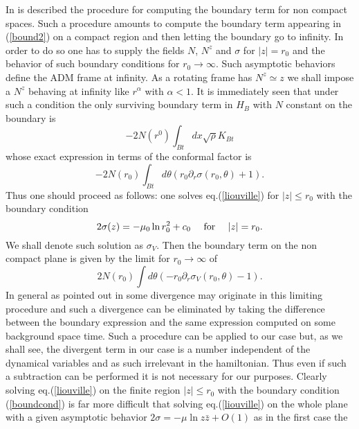 \documentclass[a4paper,12pt]{article}
\begin{document}
In \cite{hawkinghunter} is described the procedure  for computing the
boundary term for non compact spaces. Such a procedure amounts to
compute 
the boundary term appearing in (\ref{bound2}) on a compact region and then
letting the boundary go to infinity. In order to do so one
has to supply the fields $N$, $N^z$ and $\sigma$ for $|z|=r_0$ and the
behavior of such boundary conditions for $r_0\rightarrow \infty$.
Such asymptotic behaviors define the ADM frame at infinity. As a
rotating frame has $N^z \simeq z$ we shall impose a $N^z$ behaving at
infinity like $r^\alpha$ with $\alpha<1$. It is immediately seen
\cite{CMS1} that under such a condition the only surviving boundary
term in $H_B$ with $N$ constant on the boundary is
\begin{equation}
- 2N(r^0)\int_{Bt}  dx \sqrt{\rho} K_{Bt}
\end{equation}
whose exact expression in terms of the conformal factor is \cite{CMS1}
\begin{equation}
-2 N(r_0) \int_{Bt} d\theta  (r_0 \partial_r\sigma(r_0,\theta)+1).
\end{equation}
Thus one should proceed as follows: one solves eq.(\ref{liouville})
for $|z|\leq r_0$ with the boundary condition  
\begin{equation}\label{boundcond}
2\sigma (z) = -\mu_0\ln r^2_0 + c_0 ~~~~{\rm for}~~~~|z|=r_0.
\end{equation}
 We shall denote such solution as
$\sigma_V$. Then the boundary term on the non compact plane is given by 
the limit for $r_0\rightarrow \infty$ of
\begin{equation}\label{boundterm}
2 N(r_0) \int d\theta (-r_0 \partial_r\sigma_V(r_0,\theta)-1). 
\end{equation}
In general as pointed out in \cite{hawkinghunter} some divergence may
originate in this limiting procedure and such a divergence can be
eliminated by taking the difference between the boundary expression
and the same expression computed on some background space time. Such a
procedure can be applied to our case but, as we shall see, the divergent
term in our case is a number independent of the dynamical variables
and as such irrelevant in the hamiltonian. Thus even if such a
subtraction can be performed it is not necessary for our purposes.
Clearly solving eq.(\ref{liouville}) on the finite region $|z|\leq
r_0$ with the boundary condition (\ref{boundcond}) is far more
difficult that solving 
eq.(\ref{liouville}) on the whole plane with a given asymptotic
behavior $2\sigma=-\mu\ln z\bar z + O(1)$ as in the first case the
\end{document}
